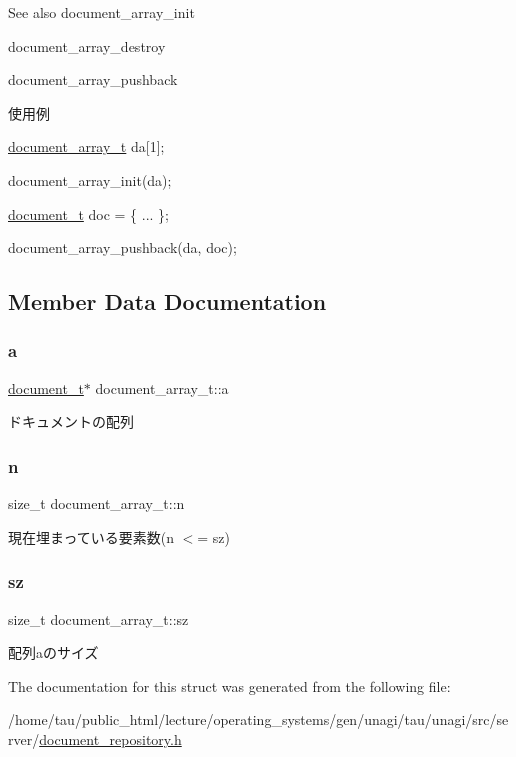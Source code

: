 \begin{DoxySeeAlso}{See also}
document\+\_\+array\+\_\+init 

document\+\_\+array\+\_\+destroy 

document\+\_\+array\+\_\+pushback
\end{DoxySeeAlso}
使用例

\hyperlink{structdocument__array__t}{document\+\_\+array\+\_\+t} da\mbox{[}1\mbox{]};

document\+\_\+array\+\_\+init(da);

\hyperlink{structdocument__t}{document\+\_\+t} doc = \{ ... \};

document\+\_\+array\+\_\+pushback(da, doc); 

\subsection{Member Data Documentation}
\mbox{\label{structdocument__array__t_a78b00a75f138da85c3342bc4cbd14ee9}} 
\subsubsection{\texorpdfstring{a}{a}}
{\footnotesize\ttfamily \hyperlink{structdocument__t}{document\+\_\+t}$\ast$ document\+\_\+array\+\_\+t\+::a}

ドキュメントの配列 \mbox{\label{structdocument__array__t_a5ffc023dad1cae730d69ace33c2f4853}} 
\subsubsection{\texorpdfstring{n}{n}}
{\footnotesize\ttfamily size\+\_\+t document\+\_\+array\+\_\+t\+::n}

現在埋まっている要素数(n $<$= sz) \mbox{\label{structdocument__array__t_a80cf2efb148f704dedae66740b418bab}} 
\subsubsection{\texorpdfstring{sz}{sz}}
{\footnotesize\ttfamily size\+\_\+t document\+\_\+array\+\_\+t\+::sz}

配列aのサイズ 

The documentation for this struct was generated from the following file\+:\begin{DoxyCompactItemize}
\item 
/home/tau/public\+\_\+html/lecture/operating\+\_\+systems/gen/unagi/tau/unagi/src/server/\hyperlink{document__repository_8h}{document\+\_\+repository.\+h}\end{DoxyCompactItemize}
